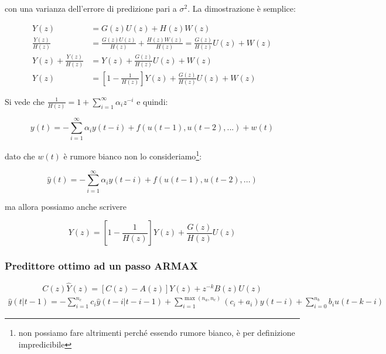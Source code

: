 con una varianza dell'errore di predizione pari a $\sigma^2$. La dimostrazione è semplice:
\begin{dimostrazione}
  \begin{align*}
    Y(z)&=G(z)U(z)+H(z)W(z)\\
    \frac{Y(z)}{H(z)}&=\frac{G(z)U(z)}{H(z)}+\frac{H(z)W(z)}{H(z)}=\frac{G(z)}{H(z)}U(z)+W(z)\\
    Y(z)+\frac{Y(z)}{H(z)}&=Y(z)+\frac{G(z)}{H(z)}U(z)+W(z)\\
    Y(z)&=\left[ 1-\frac{1}{H(z)} \right]Y(z)+\frac{G(z)}{H(z)}U(z)+W(z)
  \end{align*}

Si vede che $\frac{1}{H(z)}=1+\sum_{i=1}^{\infty}{\alpha_i z^{-i}}$ e quindi:

  \[ y(t)=-\sum_{i=1}^{\infty}{\alpha_i y(t-i)} + f(u(t-1),u(t-2),...)+w(t) \]

dato che $w(t)$ è rumore bianco non lo consideriamo\footnote{non possiamo fare altrimenti perché essendo rumore bianco, è per definizione impredicibile}:

   \[ \hat{y}(t)=-\sum_{i=1}^{\infty}{\alpha_i y(t-i)} + f(u(t-1),u(t-2),...) \]

ma allora possiamo anche scrivere

  \[ Y(z)=\left[ 1-\frac{1}{H(z)} \right]Y(z)+\frac{G(z)}{H(z)}U(z) \]
 \quad
\end{dimostrazione}
\subsubsection{Predittore ottimo ad un passo ARMAX}
  \[ C(z)\hat{Y}(z)=[C(z)-A(z)]Y(z)+z^{-k}B(z)U(z) \]
  \[ 
    \begin{split}
      \hat{y}(t|t-1)=-\sum_{i=1}^{n_c}{c_i\hat{y}(t-i|t-i-1)}+\sum_{i=1}^{\max(n_a,n_c)}{(c_i+a_i)y(t-i)}+\sum_{i=0}^{n_b}{b_iu(t-k-i)}
    \end{split}
   \]
